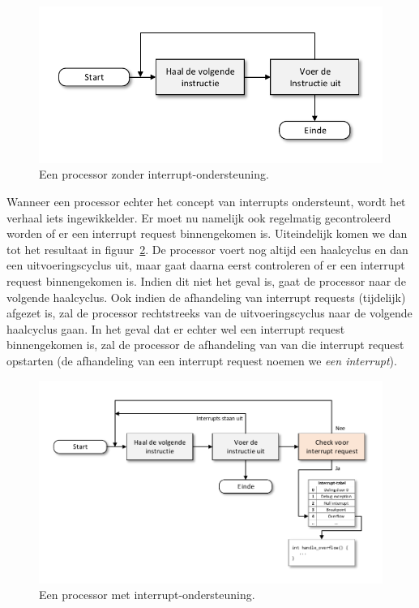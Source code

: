 \begin{figure}
  \centering
  \includegraphics[scale=0.8]{images/NoInterrupts.pdf}
  \caption{Een processor zonder interrupt-ondersteuning.}\label{fig:nointerrupts}
\end{figure}

Wanneer een processor echter het concept van interrupts ondersteunt, wordt het verhaal iets ingewikkelder. Er moet nu namelijk ook regelmatig gecontroleerd worden of er een interrupt request binnengekomen is. Uiteindelijk komen we dan tot het resultaat in figuur~\ref{fig:withinterrupts}. De processor voert nog altijd een haalcyclus en dan een uitvoeringscyclus uit, maar gaat daarna eerst controleren of er een interrupt request binnengekomen is. Indien dit niet het geval is, gaat de processor naar de volgende haalcyclus. Ook indien de afhandeling van interrupt requests (tijdelijk) afgezet is, zal de processor rechtstreeks van de uitvoeringscyclus naar de volgende haalcyclus gaan. In het geval dat er echter wel een interrupt request binnengekomen is, zal de processor de afhandeling van van die interrupt request opstarten (de afhandeling van een interrupt request noemen we \emph{een interrupt}).

\begin{figure}
\centering
\includegraphics[scale=0.8]{images/WithInterrupts.pdf}
\caption{Een processor met interrupt-ondersteuning.}\label{fig:withinterrupts}
\end{figure}

